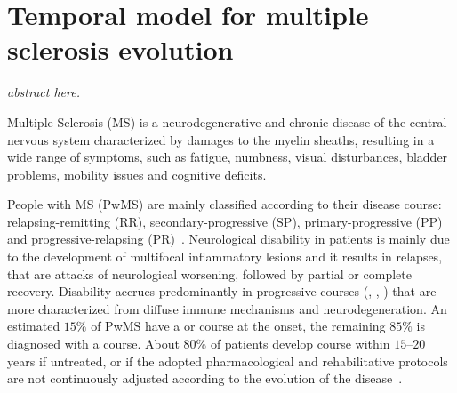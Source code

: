
\chapter{Temporal model for multiple sclerosis evolution} \label{chap:aism}

\begin{displayquote}
	\textit{abstract here.}
\end{displayquote}


Multiple Sclerosis (MS) is a neurodegenerative and chronic disease of the central nervous system characterized by damages to the myelin sheaths, resulting in a wide range of symptoms, such as fatigue, numbness, visual disturbances, bladder problems, mobility issues and cognitive deficits.


People with MS (PwMS) are mainly classified according to their disease course:
relapsing-remitting (\ac{RR}), secondary-progressive (\ac{SP}), primary-progressive (\ac{PP}) and progressive-relapsing (\ac{PR})~\cite{giovannoni2016brain}.
Neurological disability in \RR patients is mainly due to the development of multifocal inflammatory lesions and it results in relapses, that are attacks of neurological worsening, followed by partial or complete recovery. Disability accrues predominantly in progressive courses (\SP, \PP, \PR) that are more characterized from diffuse immune mechanisms and neurodegeneration.
An estimated $15\%$ of PwMS have a \PP or \PR course at the onset, the remaining $85\%$ is diagnosed with a \RR course.
About $80\%$ of \RR patients develop \SP course within $15\text{--}20$ years if untreated, or if the adopted pharmacological and rehabilitative protocols are not continuously adjusted according to the evolution of the disease~\cite{scalfari2014onset}.



